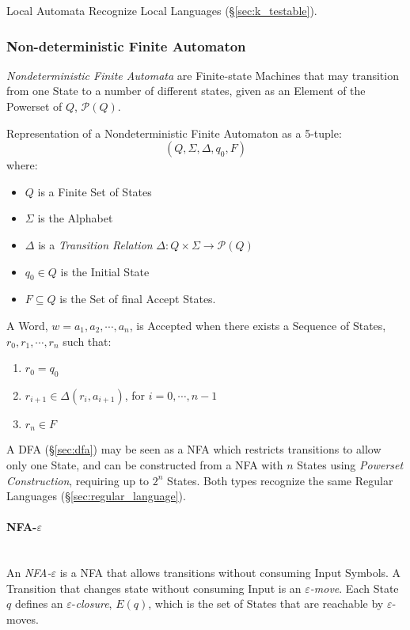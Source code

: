 Local Automata Recognize Local Languages (\S\ref{sec:k_testable}).



\subsubsection{Non-deterministic Finite Automaton}\label{sec:ndfa}

\emph{Nondeterministic Finite Automata} are Finite-state Machines that
may transition from one State to a number of different states, given
as an Element of the Powerset of $Q$, $\mathcal{P}(Q)$.

Representation of a Nondeterministic Finite Automaton as a
5-tuple:
\[
  (Q,\Sigma,\Delta,q_0,F)
\]
where:
\begin{itemize}
  \item $Q$ is a Finite Set of States
  \item $\Sigma$ is the Alphabet
  \item $\Delta$ is a \emph{Transition Relation} $\Delta: Q \times
    \Sigma \rightarrow \mathcal{P}(Q)$
  \item $q_0 \in Q$ is the Initial State
  \item $F \subseteq Q$ is the Set of final Accept States.
\end{itemize}

A Word, $w=a_1,a_2,\cdots,a_n$, is Accepted when there exists a
Sequence of States, $r_0,r_1,\cdots,r_n$ such that:
\begin{enumerate}
  \item $r_0 = q_0$
  \item $r_{i+1} \in \Delta(r_i, a_{i+1})$, for $i = 0, \cdots, n-1$
  \item $r_n \in F$
\end{enumerate}

A DFA (\S\ref{sec:dfa}) may be seen as a NFA which restricts
transitions to allow only one State, and can be constructed from a NFA
with $n$ States using \emph{Powerset Construction}, requiring up to
$2^n$ States. Both types recognize the same Regular Languages
(\S\ref{sec:regular_language}).



\paragraph{NFA-$\varepsilon$}\label{sec:nfa_e}\hfill \\
An \emph{NFA-$\varepsilon$} is a NFA that allows transitions without
consuming Input Symbols. A Transition that changes state without
consuming Input is an \emph{$\varepsilon$-move}. Each State $q$
defines an $\varepsilon$-\emph{closure}, $E(q)$, which is the set of
States that are reachable by $\varepsilon$-moves.

